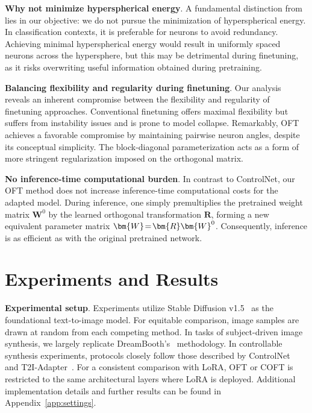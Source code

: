 \textbf{Why not minimize hyperspherical energy}. A fundamental distinction from \cite{liu2021orthogonal} lies in our objective: we do not pursue the minimization of hyperspherical energy. In classification contexts, it is preferable for neurons to avoid redundancy. Achieving minimal hyperspherical energy would result in uniformly spaced neurons across the hypersphere, but this may be detrimental during finetuning, as it risks overwriting useful information obtained during pretraining.

\textbf{Balancing flexibility and regularity during finetuning}. Our analysis reveals an inherent compromise between the flexibility and regularity of finetuning approaches. Conventional finetuning offers maximal flexibility but suffers from instability issues and is prone to model collapse. Remarkably, OFT achieves a favorable compromise by maintaining pairwise neuron angles, despite its conceptual simplicity. The block-diagonal parameterization acts as a form of more stringent regularization imposed on the orthogonal matrix.

\textbf{No inference-time computational burden}. In contrast to ControlNet, our OFT method does not increase inference-time computational costs for the adapted model. During inference, one simply premultiplies the pretrained weight matrix $\bm{W}^0$ by the learned orthogonal transformation $\bm{R}$, forming a new equivalent parameter matrix $\thickmuskip=2mu \medmuskip=2mu \bm{W}=\bm{R}\bm{W}^0$. Consequently, inference is as efficient as with the original pretrained network.

\section{Experiments and Results}

\textbf{Experimental setup}. Experiments utilize Stable Diffusion v1.5~\cite{rombach2022high} as the foundational text-to-image model. For equitable comparison, image samples are drawn at random from each competing method. In tasks of subject-driven image synthesis, we largely replicate DreamBooth’s~\cite{ruiz2023dreambooth} methodology. In controllable synthesis experiments, protocols closely follow those described by ControlNet~\cite{zhang2023adding} and T2I-Adapter~\cite{mou2023t2i}. For a consistent comparison with LoRA, OFT or COFT is restricted to the same architectural layers where LoRA is deployed. Additional implementation details and further results can be found in Appendix~\ref{app:settings}.

